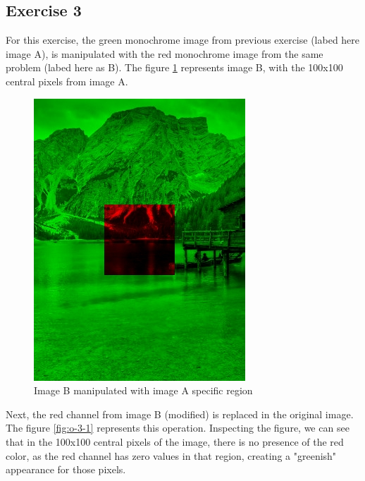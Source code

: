 \documentclass[]{IEEEtran}
\begin{document}
  \subsection{Exercise 3}
  For this exercise, the green monochrome image from previous exercise (labed here image A), is manipulated with the red monochrome image from the same problem (labed here as B). The figure \ref{fig:o-3-0} represents image B, with the 100x100 central pixels from image A.  
  \begin{figure}[!h]
    \centering
    \includegraphics[width=0.8\hsize]{../output/o-3-0.jpg}
    \caption{Image B manipulated with image A specific region}
    \label{fig:o-3-0}
  \end{figure}
  Next, the red channel from image B (modified) is replaced in the original image. The figure \ref{fig:o-3-1} represents this operation. Inspecting the figure, we can see that in the 100x100 central pixels of the image, there is no presence of the red color, as the red channel has zero values in that region, creating a "greenish" appearance for those pixels. 
  
\end{document}
